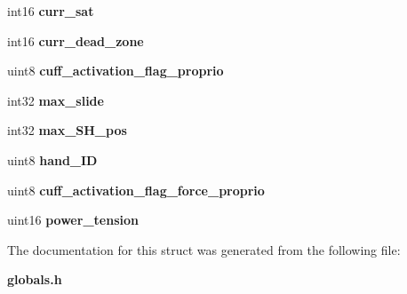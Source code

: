 \begin{DoxyCompactItemize}
\item 
\mbox{\label{structst__mem_a265823b08bf0a28fce5b8f88e1484a90}} 
int16 {\bfseries curr\+\_\+sat}
\item 
\mbox{\label{structst__mem_ab5de0972c87f6694962649fc1ad9acba}} 
int16 {\bfseries curr\+\_\+dead\+\_\+zone}
\item 
\mbox{\label{structst__mem_a6aaaf4627d20e0de8288d3cccd71a96b}} 
uint8 {\bfseries cuff\+\_\+activation\+\_\+flag\+\_\+proprio}
\item 
\mbox{\label{structst__mem_a8817f0f2fbf8894045b357239161786a}} 
int32 {\bfseries max\+\_\+slide}
\item 
\mbox{\label{structst__mem_a0078be2725074ff1af93f0ef89fd8500}} 
int32 {\bfseries max\+\_\+\+S\+H\+\_\+pos}
\item 
\mbox{\label{structst__mem_ace63e4b074bf57e09d963e5cd45e2da6}} 
uint8 {\bfseries hand\+\_\+\+ID}
\item 
\mbox{\label{structst__mem_a8404391b32fad25ab197ebc5e77526c8}} 
uint8 {\bfseries cuff\+\_\+activation\+\_\+flag\+\_\+force\+\_\+proprio}
\item 
\mbox{\label{structst__mem_a59ed30e5aa7ccfd0b5f77c0805ac76f3}} 
uint16 {\bfseries power\+\_\+tension}
\end{DoxyCompactItemize}


The documentation for this struct was generated from the following file\+:\begin{DoxyCompactItemize}
\item 
\textbf{ globals.\+h}\end{DoxyCompactItemize}
